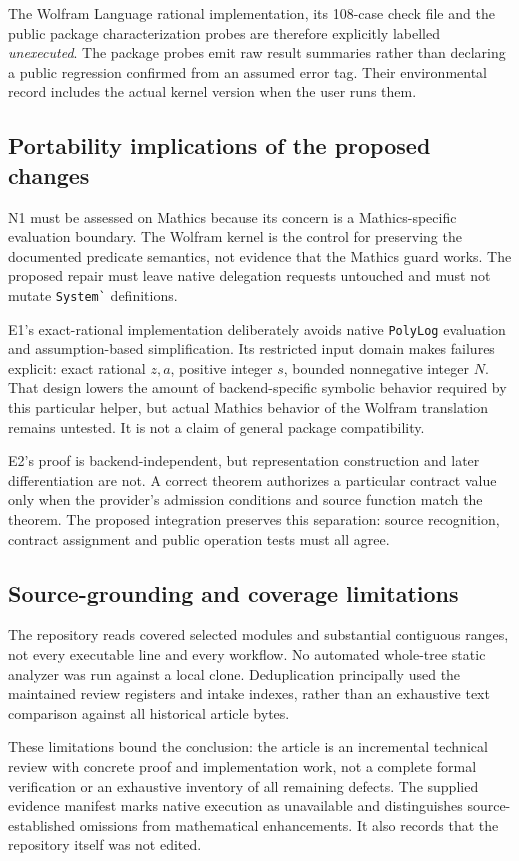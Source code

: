 \documentclass[11pt,a4paper]{article}
\newcommand{\code}[1]{\nolinkurl{#1}}
\begin{document}
The Wolfram Language rational implementation, its 108-case check file and the public package characterization probes are therefore explicitly labelled \emph{unexecuted}. The package probes emit raw result summaries rather than declaring a public regression confirmed from an assumed error tag. Their environmental record includes the actual kernel version when the user runs them.

\subsection{Portability implications of the proposed changes}
N1 must be assessed on Mathics because its concern is a Mathics-specific evaluation boundary. The Wolfram kernel is the control for preserving the documented predicate semantics, not evidence that the Mathics guard works. The proposed repair must leave native delegation requests untouched and must not mutate \code{System`} definitions.

E1's exact-rational implementation deliberately avoids native \code{PolyLog} evaluation and assumption-based simplification. Its restricted input domain makes failures explicit: exact rational $z,a$, positive integer $s$, bounded nonnegative integer $N$. That design lowers the amount of backend-specific symbolic behavior required by this particular helper, but actual Mathics behavior of the Wolfram translation remains untested. It is not a claim of general package compatibility.

E2's proof is backend-independent, but representation construction and later differentiation are not. A correct theorem authorizes a particular contract value only when the provider's admission conditions and source function match the theorem. The proposed integration preserves this separation: source recognition, contract assignment and public operation tests must all agree.

\subsection{Source-grounding and coverage limitations}
The repository reads covered selected modules and substantial contiguous ranges, not every executable line and every workflow. No automated whole-tree static analyzer was run against a local clone. Deduplication principally used the maintained review registers and intake indexes, rather than an exhaustive text comparison against all historical article bytes.

These limitations bound the conclusion: the article is an incremental technical review with concrete proof and implementation work, not a complete formal verification or an exhaustive inventory of all remaining defects. The supplied evidence manifest marks native execution as unavailable and distinguishes source-established omissions from mathematical enhancements. It also records that the repository itself was not edited.
\end{document}
